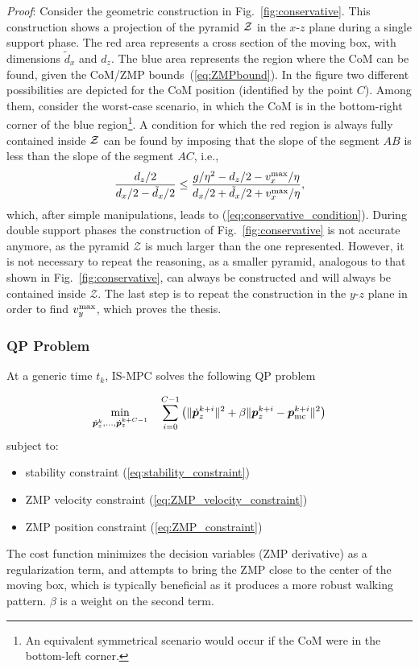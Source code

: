 {\em Proof}: Consider the geometric construction in Fig.~\ref{fig:conservative}. This construction shows a projection of the pyramid ${\cal Z}$ in the $x$-$z$ plane during a single support phase. The red area represents a cross section of the moving box, with dimensions $\tilde d_x$ and $d_z$. The blue area represents the region where the CoM can be found, given the CoM/ZMP bounds~(\ref{eq:ZMPbound}). In the figure two different possibilities are depicted for the CoM position (identified by the point $C$). Among them, consider the worst-case scenario, in which the CoM is in the bottom-right corner of the blue region\footnote{An equivalent symmetrical scenario would occur if the CoM were in the bottom-left corner. }. A condition for which the red region is always fully contained inside $\cal Z$ can be found by imposing that the slope of the segment $AB$ is less than the slope of the segment $AC$, i.e.,
\begin{equation}
\frac{d_z/2}{d_x/2 - \tilde d_x/2} \le \frac{g/\eta^2 - d_z/2 - v^{\rm max}_x/\eta}{d_x/2 + \tilde d_x/2 + v^{\rm max}_x/\eta},
\end{equation}
which, after simple manipulations, leads to (\ref{eq:conservative_condition}). During double support phases the construction of Fig.~\ref{fig:conservative} is not accurate anymore, as the pyramid $\mathcal{Z}$ is much larger than the one represented. However, it is not necessary to repeat the reasoning, as a smaller pyramid, analogous to that shown in Fig.~\ref{fig:conservative}, can always be constructed and will always be contained inside $\mathcal{Z}$. The last step is to repeat the construction in the $y$-$z$ plane in order to find $v_y^{\rm max}$, which proves the thesis.
\hfill\bull
\smallskip
\subsubsection{QP Problem}
At a generic time $t_k$, IS-MPC solves the following QP problem

\smallskip

\begin{braced}
\[
\min_{\dot {{\bm{p}}}_z^k, \dots, \dot {{\bm{p}}}_z^{k+C-1}} \quad \sum_{i=0}^{C-1} \left(\|\dot{{\bm{p}}}_z^{k+i}\|^2 + \beta\|{\bm{p}}_z^{k+i} - {\bm{p}}_{\rm mc}^{k+i}\|^2\right)
\]
\hspace{0.25cm} subject to:
\begin{itemize}
\item stability constraint (\ref{eq:stability_constraint})
\item ZMP velocity constraint (\ref{eq:ZMP_velocity_constraint})
\item ZMP position constraint (\ref{eq:ZMP_constraint})
\end{itemize}
\end{braced}
\smallskip
The cost function minimizes the decision variables (ZMP derivative) as a regularization term, and attempts to bring the ZMP close to the center of the moving box, which is typically beneficial as it produces a more robust walking pattern. $\beta$ is a weight on the second term.

